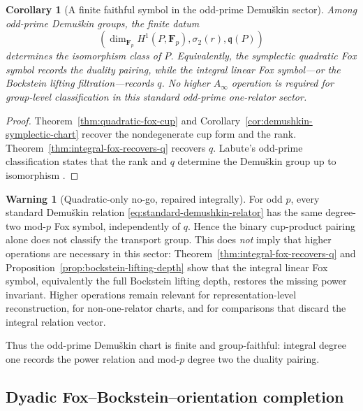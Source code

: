 \documentclass[11pt]{article}
\newtheorem{corollary}[theorem]{Corollary}
\theoremstyle{definition}
\newtheorem{warning}[theorem]{Warning}
\begin{document}
\begin{corollary}[A finite faithful symbol in the odd-prime Demu\v{s}kin sector]\label{cor:faithful-demushkin-symbol}
Among odd-prime Demu\v{s}kin groups, the finite datum
\begin{equation}\label{eq:faithful-demushkin-symbol}
\left(
\dim_{\mathbf F_p}H^1(P,\mathbf F_p),
\sigma_2(r),
\mathfrak q(P)
\right)
\end{equation}
determines the isomorphism class of $P$.  Equivalently, the symplectic quadratic Fox symbol records the duality pairing, while the integral linear Fox symbol---or the Bockstein lifting filtration---records $q$.  No higher $A_\infty$ operation is required for group-level classification in this standard odd-prime one-relator sector.
\end{corollary}

\begin{proof}
Theorem~\ref{thm:quadratic-fox-cup} and Corollary~\ref{cor:demushkin-symplectic-chart} recover the nondegenerate cup form and the rank.  Theorem~\ref{thm:integral-fox-recovers-q} recovers $q$.  Labute's odd-prime classification states that the rank and $q$ determine the Demu\v{s}kin group up to isomorphism \cite{LabuteClassification}.
\end{proof}

\begin{warning}[Quadratic-only no-go, repaired integrally]\label{warn:quadratic-symbol-q-nogo}
For odd $p$, every standard Demu\v{s}kin relation \eqref{eq:standard-demushkin-relator} has the same degree-two mod-$p$ Fox symbol, independently of $q$.  Hence the binary cup-product pairing alone does not classify the transport group.  This does \emph{not} imply that higher operations are necessary in this sector: Theorem~\ref{thm:integral-fox-recovers-q} and Proposition~\ref{prop:bockstein-lifting-depth} show that the integral linear Fox symbol, equivalently the full Bockstein lifting depth, restores the missing power invariant.  Higher operations remain relevant for representation-level reconstruction, for non-one-relator charts, and for comparisons that discard the integral relation vector.
\end{warning}

Thus the odd-prime Demu\v{s}kin chart is finite and group-faithful: integral degree one records the power relation and mod-$p$ degree two the duality pairing.

\subsection{Dyadic Fox--Bockstein--orientation completion}
\label{subsec:dyadic-fox-orientation}
\end{document}
